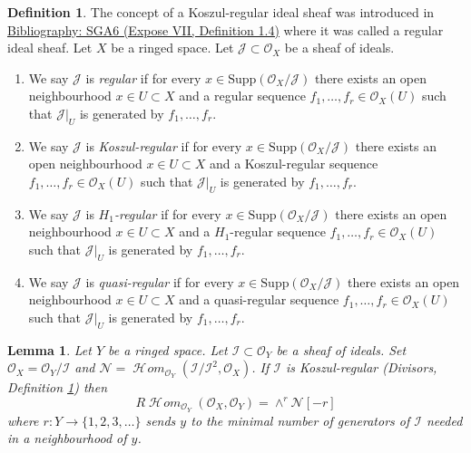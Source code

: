 \documentclass{amsart}
\newenvironment{reference}{\comment}{\endcomment}
\theoremstyle{plain}
\newtheorem{lemma}[subsection]{Lemma}
\theoremstyle{definition}
\newtheorem{definition}[subsection]{Definition}
\theoremstyle{remark}
\numberwithin{equation}{subsection}
\def\SheafHom{\mathop{\mathcal{H}\!\mathit{om}}\nolimits}
\begin{document}
\begin{definition}
\label{divisors-definition-regular-ideal-sheaf}
\begin{reference}
The concept of a Koszul-regular ideal sheaf was introduced in
\href{https://stacks.math.columbia.edu/bibliography}{Bibliography: SGA6 (Expose VII, Definition 1.4)} where it was called a
regular ideal sheaf.
\end{reference}
Let $X$ be a ringed space. Let $\mathcal{J} \subset \mathcal{O}_X$
be a sheaf of ideals.
\begin{enumerate}
\item We say $\mathcal{J}$ is {\it regular} if for every
$x \in \text{Supp}(\mathcal{O}_X/\mathcal{J})$ there exists an open
neighbourhood $x \in U \subset X$ and a regular sequence
$f_1, \ldots, f_r \in \mathcal{O}_X(U)$ such that $\mathcal{J}|_U$
is generated by $f_1, \ldots, f_r$.
\item We say $\mathcal{J}$ is {\it Koszul-regular} if for every
$x \in \text{Supp}(\mathcal{O}_X/\mathcal{J})$ there exists an open
neighbourhood $x \in U \subset X$ and a Koszul-regular sequence
$f_1, \ldots, f_r \in \mathcal{O}_X(U)$ such that $\mathcal{J}|_U$
is generated by $f_1, \ldots, f_r$.
\item We say $\mathcal{J}$ is {\it $H_1$-regular} if for every
$x \in \text{Supp}(\mathcal{O}_X/\mathcal{J})$ there exists an open
neighbourhood $x \in U \subset X$ and a $H_1$-regular sequence
$f_1, \ldots, f_r \in \mathcal{O}_X(U)$ such that $\mathcal{J}|_U$
is generated by $f_1, \ldots, f_r$.
\item We say $\mathcal{J}$ is {\it quasi-regular} if for every
$x \in \text{Supp}(\mathcal{O}_X/\mathcal{J})$ there exists an open
neighbourhood $x \in U \subset X$ and a quasi-regular sequence
$f_1, \ldots, f_r \in \mathcal{O}_X(U)$ such that $\mathcal{J}|_U$
is generated by $f_1, \ldots, f_r$.
\end{enumerate}
\end{definition}

\begin{lemma}
\label{lemma-regular-immersion-ext}
Let $Y$ be a ringed space. Let $\mathcal{I} \subset \mathcal{O}_Y$
be a sheaf of ideals. Set $\mathcal{O}_X = \mathcal{O}_Y/\mathcal{I}$ and
$\mathcal{N} =
\SheafHom_{\mathcal{O}_Y}(\mathcal{I}/\mathcal{I}^2, \mathcal{O}_X)$.
If $\mathcal{I}$ is Koszul-regular
(Divisors, Definition \ref{divisors-definition-regular-ideal-sheaf}) then
$$
R\SheafHom_{\mathcal{O}_Y}(\mathcal{O}_X, \mathcal{O}_Y) =
\wedge^r \mathcal{N}[-r]
$$
where $r : Y \to \{1, 2, 3, \ldots \}$ sends $y$ to
the minimal number of generators of $\mathcal{I}$ needed in a neighbourhood
of $y$.
\end{lemma}
\end{document}

